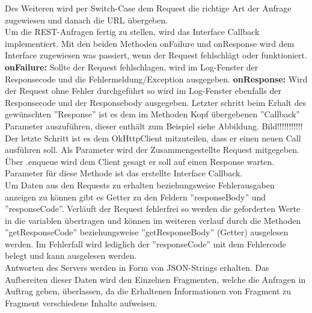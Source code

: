 Des Weiteren wird per Switch-Case dem Request die richtige Art der Anfrage zugewiesen und danach die URL übergeben. 
\\
Um die REST-Anfragen fertig zu stellen, wird das Interface Callback implementiert. Mit den beiden Methoden onFailure und onResponse wird dem Interface zugewiesen was passiert, wenn der Request fehlschlägt oder funktioniert. 
\\
\textbf{onFailure:}
Sollte der Request fehlschlagen, wird im Log-Fenster der Responsecode und die Fehlermeldung/Exception ausgegeben. 
\textbf{onResponse:}
Wird der Request ohne Fehler durchgeführt so wird im Log-Fenster ebenfalls der Responsecode und der Responsebody ausgegeben. Letzter schritt beim Erhalt des gewünschten ''Response'' ist es dem im Methoden Kopf übergebenen ''Callback'' Parameter auszuführen, dieser enthält zum Beispiel siehe Abbildung.
Bild!!!!!!!!!!!
\\
Der letzte Schritt ist es dem OkHttpClient mitzuteilen, dass er einen neuen Call ausführen soll. Als Parameter wird der Zusammengestellte Request mitgegeben. Über .enqueue wird dem Client gesagt er soll auf einen Response warten. Parameter für diese Methode ist das erstellte Interface Callback.
\cite{OkHttp3}
\\
Um Daten aus den Requests zu erhalten beziehungsweise Fehlerausgaben anzeigen zu können gibt es Getter zu den Feldern ''responseBody'' und ''responseCode''. Verläuft der Request fehlerfrei so werden die geforderten Werte in die variablen übertragen und können im weiteren verlauf durch die Methoden ''getResponseCode'' beziehungsweise ''getResponseBody'' (Getter) ausgelesen werden. Im Fehlerfall wird lediglich der ''responseCode'' mit dem Fehlercode belegt und kann ausgelesen werden. 
\\
Antworten des Servers werden in Form von JSON-Strings erhalten. Das Aufbereiten dieser Daten wird den Einzelnen Fragmenten, welche die Anfragen in Auftrag geben, überlassen, da die Erhaltenen Informationen von Fragment zu Fragment verschiedene Inhalte aufweisen. 
\\
